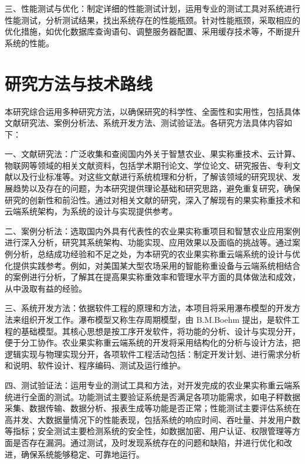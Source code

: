 \documentclass{xduugthesis}
\begin{document}
三、性能测试与优化：制定详细的性能测试计划，运用专业的测试工具对系统进行性能测试，分析测试结果，找出系统存在的性能瓶颈。针对性能瓶颈，采取相应的优化措施，如优化数据库查询语句、调整服务器配置、采用缓存技术等，不断提升系统的性能。


\section{研究方法与技术路线}

本研究综合运用多种研究方法，以确保研究的科学性、全面性和实用性，包括具体文献研究法、案例分析法、系统开发方法、测试验证法。各研究方法具体内容如下：

一、文献研究法：广泛收集和查阅国内外关于智慧农业、果实称重技术、云计算、物联网等领域的相关文献资料，包括学术期刊论文、学位论文、研究报告、专利文献以及行业标准等。对这些文献进行系统梳理和分析，了解该领域的研究现状、发展趋势以及存在的问题，为本研究提供理论基础和研究思路，避免重复研究，确保研究的创新性和前沿性。通过对相关文献的研究，深入了解现有的果实称重技术和云端系统架构，为系统的设计与实现提供参考。

二、案例分析法：选取国内外具有代表性的农业果实称重项目和智慧农业应用案例进行深入分析，研究其系统架构、功能实现、应用效果以及面临的挑战等。通过案例分析，总结成功经验和不足之处，为本研究的农业果实称重云端系统的设计与优化提供实践参考。例如，对美国某大型农场采用的智能称重设备与云端系统相结合的案例\cite{Anisha2019FruitRU}进行分析，了解其在提高果实称重效率和管理水平方面的具体做法和成效，从中汲取有益的经验。

三、系统开发方法：依据软件工程的原理和方法，本项目将采用瀑布模型的开发方法来组织开发工作。瀑布模型又称生存周期模型，由 B.M.Boehm 提出，是软件工程的基础模型。其核心思想是按工序开发软件，将功能的分析、设计与实现分开，便于分工协作\cite{叶俊民2006软件工程}。农业果实称重云端系统的开发将采用结构化的分析与设计方法，把逻辑实现与物理实现分开，各项软件工程活动包括：制定开发计划、进行需求分析和说明、软件设计、程序编码、测试及运行维护。

四、测试验证法：运用专业的测试工具和方法，对开发完成的农业果实称重云端系统进行全面的测试。功能测试主要验证系统是否满足各项功能需求，如电子秤数据采集、数据传输、数据分析、报表生成等功能是否正常；性能测试主要评估系统在高并发、大数据量情况下的性能表现，包括系统的响应时间、吞吐量、并发用户数等指标；安全测试主要检测系统的安全性，如数据加密、用户认证、权限管理等方面是否存在漏洞。通过测试，及时发现系统存在的问题和缺陷，并进行优化和改进，确保系统能够稳定、可靠地运行。
\end{document}
